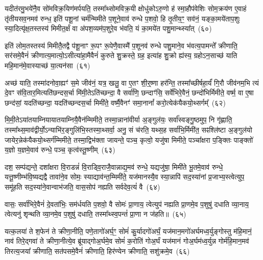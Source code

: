 यदीत॑रमु॒भये॑नै॒व सो॑मविक्र॒यिण॑मर्पयति॒ तस्मा᳚थ्सोमविक्र॒यी क्षोधु॑को\-ऽरु॒णो ह॑ स्मा॒हौप॑वेशिः सोम॒क्रय॑ण ए॒वाहं तृ॑तीयसव॒नमव॑ रुन्ध॒ इति॑ पशू॒नां चर्म॑न्मिमीते प॒शूने॒वाव॑ रुन्धे प॒शवो॒ हि तृ॒तीय॒ꣳ॒ सव॑नं॒ यङ्का॒मये॑ताप॒शुः स्या॒दित्यृ॑क्ष॒तस्तस्य॑ मिमीत॒र्क्षं वा अ॑पश॒व्यम॑प॒शुरे॒व भ॑वति॒ यं का॒मये॑त पशु॒मान्थ्स्या᳚त्~(६०)

इति॑ लोम॒तस्तस्य॑ मिमीतै॒तद्वै प॑शू॒नाꣳ रू॒पꣳ रू॒पेणै॒वास्मै॑ प॒शूनव॑ रुन्धे पशु॒माने॒व भ॑वत्य॒पामन्ते᳚ क्रीणाति॒ सर॑समे॒वैनं॑ क्रीणात्य॒मात्यो॒\-ऽसीत्या॑हा॒मैवैनं॑ कुरुते शु॒क्रस्ते॒ ग्रह॒ इत्या॑ह शु॒क्रो ह्य॑स्य॒ ग्रहो\-ऽन॒साच्छ॑ याति महि॒मान॑मे॒वास्याच्छ॑ या॒त्यन॑सा~(६१)

अच्छ॑ याति॒ तस्मा॑दनोवा॒ह्यꣳ॑ स॒मे जीव॑नं॒ यत्र॒ खलु॒ वा ए॒तꣳ शी॒र्॒\mbox{}ष्णा हर॑न्ति॒ तस्मा᳚च्छीर्\mbox{}षहा॒र्यं॑ गि॒रौ जीव॑नम॒भि त्यं दे॒वꣳ स॑वि॒तार॒मित्यति॑छन्दस॒र्चा मि॑मी॒ते\-ऽति॑च्छन्दा॒ वै सर्वा॑णि॒ छन्दाꣳ॑सि॒ सर्वे॑भिरे॒वैनं॒ छन्दो॑भिर्मिमीते॒ वर्\mbox{}ष्म॒ वा ए॒षा छन्द॑सां॒ यदति॑च्छन्दा॒ यदति॑च्छन्दस॒र्चा मिमी॑ते॒ वर्\mbox{}ष्मै॒वैनꣳ॑ समा॒नानां᳚ करो॒त्येक॑यैकयो॒थ्सर्गम्᳚~(६२)

मि॒मी॒ते\-ऽया॑तयाम्नियायातयाम्नियै॒वैन॑म्मिमीते॒ तस्मा॒न्नाना॑वीर्या अ॒ङ्गुल॑यः॒ सर्वा᳚स्वङ्गु॒ष्ठमुप॒ नि गृ॑ह्णाति॒ तस्मा᳚थ्स॒माव॑द्वीर्यो॒\-ऽन्याभि॑र॒ङ्गुलि॑भि॒स्तस्मा॒थ्सर्वा॒ अनु॒ सं च॑रति॒ यथ्स॒ह सर्वा॑भि॒र्मिमी॑त॒ सꣴश्लि॑ष्टा अ॒ङ्गुल॑यो जायेर॒न्नेक॑यैकयो॒थ्सर्ग॑म्मिमीते॒ तस्मा॒द्विभ॑क्ता जायन्ते॒ पञ्च॒ कृत्वो॒ यजु॑षा मिमीते॒ पञ्चा᳚क्षरा प॒ङ्क्तिः पाङ्क्तो॑ य॒ज्ञो य॒ज्ञमे॒वाव॑ रुन्धे॒ पञ्च॒ कृत्व॑स्तू॒ष्णीम्~(६३)

दश॒ सम्प॑द्यन्ते॒ दशा᳚क्षरा वि॒राडन्नं॑ वि॒राड्वि॒राजै॒वान्नाद्य॒मव॑ रुन्धे॒ यद्यजु॑षा॒ मिमी॑ते भू॒तमे॒वाव॑ रुन्धे॒ यत्तू॒ष्णीम्भ॑वि॒ष्यद्यद्वै तावा॑ने॒व सोमः॒ स्याद्याव॑न्त॒म्मिमी॑ते॒ यज॑मानस्यै॒व स्या॒न्नापि॑ सद॒स्या॑नां प्र॒जाभ्य॒स्त्वेत्युप॒ समू॑हति सद॒स्या॑ने॒वान्वाभ॑जति॒ वास॒सोप॑ नह्यति सर्वदेव॒त्यं॑ वै~(६४)

वासः॒ सर्वा॑भिरे॒वैनं॑ दे॒वता॑भिः॒ सम॑र्धयति प॒शवो॒ वै सोमः॑ प्रा॒णाय॒ त्वेत्युप॑ नह्यति प्रा॒णमे॒व प॒शुषु॑ दधाति व्या॒नाय॒ त्वेत्यनु॑ शृन्थति व्या॒नमे॒व प॒शुषु॑ दधाति॒ तस्मा᳚थ्स्व॒पन्तं॑ प्रा॒णा न ज॑हति॥~(६५)

{\anuvakamend[{इत॑रम्पशु॒मान्थ्स्या᳚द्या॒त्यन॑सो॒थ्सर्ग॑न्तू॒ष्णीꣳ स॑र्वदेव॒त्यं॑ वै त्रय॑स्त्रिꣳशच्च}]}%

यत्क॒लया॑ ते श॒फेन॑ ते क्रीणा॒नीति॒ पणे॒तागो॑अर्घ॒ꣳ॒ सोमं॑ कु॒र्यादगो॑अर्घं॒ यज॑मान॒मगो॑अर्घमध्व॒र्युङ्गोस्तु म॑हि॒मानं॒ नाव॑ तिरे॒द्गवा॑ ते क्रीणा॒नीत्ये॒व ब्रू॑याद्गोअ॒र्घमे॒व सोमं॑ क॒रोति॑ गोअ॒र्घं यज॑मानं गोअ॒र्घम॑ध्व॒र्युन्न गोर्म॑हि॒मान॒मव॑ तिरत्य॒जया᳚ क्रीणाति॒ सत॑पसमे॒वैनं॑ क्रीणाति॒ हिर॑ण्येन क्रीणाति॒ सशु॑क्रमे॒व~(६६)

